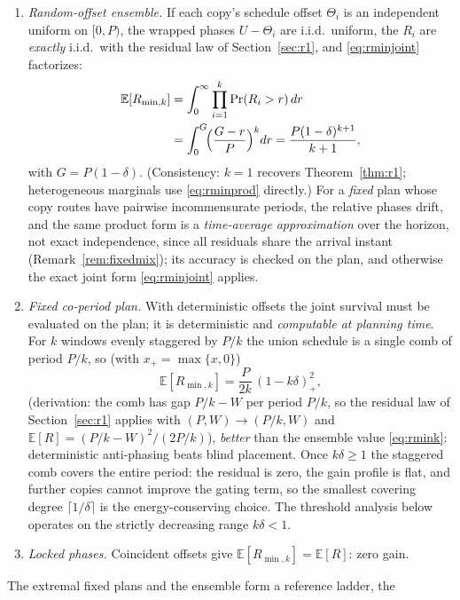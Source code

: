 \documentclass[twocolumn,3p,times,procedia]{elsarticle}
\theoremstyle{plain}
\theoremstyle{remark}
\newcommand{\E}{\mathbb{E}}
\begin{document}
\begin{enumerate}
\item[(i)] \emph{Random-offset ensemble.} If each
copy's schedule offset $\Theta_i$ is an independent uniform on
$[0,P)$, the wrapped phases $U-\Theta_i$
are i.i.d.\ uniform, the $R_i$ are \emph{exactly} i.i.d.\ with the
residual
law of Section~\ref{sec:r1}, and \eqref{eq:rminjoint} factorizes:
\begin{align}
\E[R_{\min,k}]&=\int_0^\infty\prod_{i=1}^{k}\Pr(R_i>r)\,dr
\label{eq:rminprod}\\
&=\int_0^{G}\!\Bigl(\frac{G-r}{P}\Bigr)^k dr
=\frac{P(1-\delta)^{k+1}}{k+1},\label{eq:rmink}
\end{align}
with $G=P(1-\delta)$. (Consistency: $k{=}1$ recovers
Theorem~\ref{thm:r1}; heterogeneous marginals use
\eqref{eq:rminprod} directly.) For a \emph{fixed} plan whose copy
routes have pairwise incommensurate periods, the relative phases drift,
and the same product form is a \emph{time-average approximation} over
the horizon, not exact independence, since all residuals share the
arrival instant (Remark~\ref{rem:fixedmix}); its accuracy is checked on
the plan, and otherwise the exact joint form \eqref{eq:rminjoint}
applies.
\item[(ii)] \emph{Fixed co-period plan.} With deterministic offsets the
joint survival must be evaluated on the plan; it is deterministic and
\emph{computable at planning time}. For $k$ windows evenly staggered by
$P/k$ the union schedule is a single comb of period $P/k$, so (with
$x_+=\max\{x,0\}$)
\begin{equation}\label{eq:rminstag}
\E[R_{\min,k}]=\frac{P}{2k}\,(1-k\delta)_+^2,
\end{equation}
(derivation: the comb has gap $P/k-W$ per period $P/k$, so the residual
law of Section~\ref{sec:r1} applies with $(P,W)\to(P/k,W)$ and
$\E[R]=(P/k-W)^2/(2P/k)$), \emph{better} than the ensemble value
\eqref{eq:rmink}: deterministic
anti-phasing beats blind placement. Once $k\delta\ge1$ the staggered
comb covers the entire period: the residual is zero, the gain profile
is flat, and further copies cannot improve the gating term, so the
smallest covering degree $\lceil1/\delta\rceil$ is the
energy-conserving choice. The threshold analysis below operates on the
strictly decreasing range $k\delta<1$.
\item[(iii)] \emph{Locked phases.} Coincident offsets give
$\E[R_{\min,k}]=\E[R]$: zero gain.
\end{enumerate}
The extremal fixed plans and the ensemble form a reference ladder, the
\end{document}
